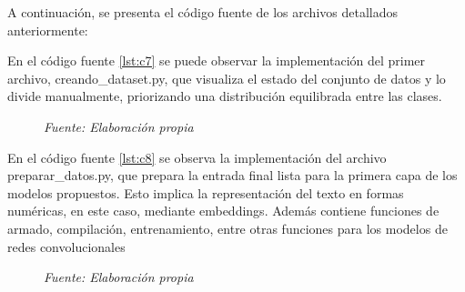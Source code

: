 A continuación, se presenta el código fuente de los  archivos detallados anteriormente:

En el código fuente \ref{lst:c7} se puede observar la implementación del primer archivo, creando\_dataset.py, que visualiza el estado del conjunto de datos y lo divide manualmente, priorizando una distribución equilibrada entre las clases.


\vspace{-1.3em} %

\begin{figure}[h!]
	\centering %
	\textit{Fuente: Elaboración propia}
\end{figure}

En el código fuente \ref{lst:c8} se observa la implementación del archivo preparar\_datos.py, que prepara la entrada final lista para la primera capa de los modelos propuestos. Esto implica la representación del texto en formas numéricas, en este caso, mediante embeddings. Además contiene funciones de armado, compilación, entrenamiento, entre otras funciones para los modelos de redes convolucionales


\vspace{-1.3em} %

\begin{figure}[h!]
	\centering %
	\textit{Fuente: Elaboración propia}
\end{figure}
